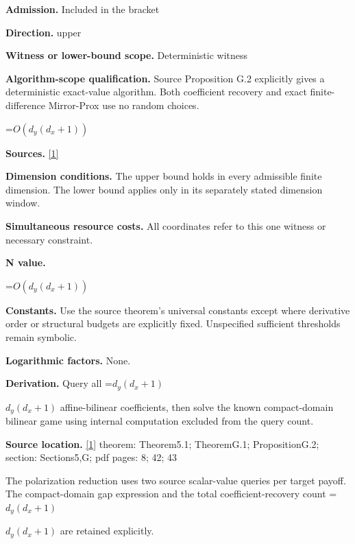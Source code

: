 \documentclass[10pt,a4paper]{article}
\newcommand{\AtlasMath}[1]{\par\begingroup\centering\setbox0=\hbox{$\displaystyle #1$}\ifdim\wd0>1.4\linewidth\typeout{ATLAS WIDE FORMULA: \the\wd0}\fi\ifdim\wd0>\linewidth\resizebox{\linewidth}{!}{\box0}\else\box0\fi\par\endgroup}
\newcommand{\AtlasInlineMath}[1]{\begingroup\setbox0=\hbox{$#1$}\ifdim\wd0>.4\linewidth\endgroup\AtlasMath{#1}\else\endgroup$#1$\fi}
\begin{document}
\textbf{Admission.} Included in the bracket



\textbf{Direction.} upper



\textbf{Witness or lower-bound scope.} Deterministic witness



\textbf{Algorithm-scope qualification.} Source Proposition G.2 explicitly gives a deterministic exact-value algorithm. Both coefficient recovery and exact finite-difference Mirror-Prox use no random choices.



\AtlasMath{O(d_y(d_x+1))}


\textbf{Sources.} \href{https://arxiv.org/pdf/2610.00345v1}{[1]}



\textbf{Dimension conditions.} The upper bound holds in every admissible finite dimension. The lower bound applies only in its separately stated dimension window.



\textbf{Simultaneous resource costs.} All coordinates refer to this one witness or necessary constraint.



\textbf{N value.}



\AtlasMath{O(d_y(d_x+1))}


\textbf{Constants.} Use the source theorem’s universal constants except where derivative order or structural budgets are explicitly fixed. Unspecified sufficient thresholds remain symbolic.



\textbf{Logarithmic factors.} None.



\textbf{Derivation.} Query all \AtlasInlineMath{d_y(d_x+1)} affine-bilinear coefficients, then solve the known compact-domain bilinear game using internal computation excluded from the query count.



\textbf{Source location.} \href{https://arxiv.org/pdf/2610.00345v1}{[1]} theorem: Theorem5.1; TheoremG.1; PropositionG.2; section: Sections5,G; pdf pages: 8; 42; 43



The polarization reduction uses two source scalar-value queries per target payoff. The compact-domain gap expression and the total coefficient-recovery count \AtlasInlineMath{d_y(d_x+1)} are retained explicitly.
\end{document}
